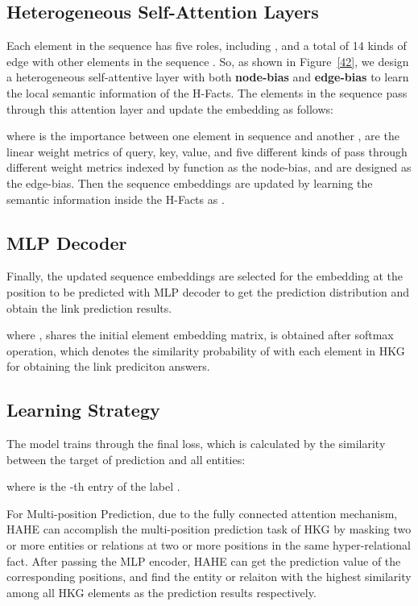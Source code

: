 \documentclass[11pt]{article}
\begin{document}
\subsection{Heterogeneous Self-Attention Layers}
 Each element in the sequence  has five roles, including , and a total of 14 kinds of edge with other elements in the sequence  . So, as shown in Figure~\ref{42}, we design a heterogeneous self-attentive layer with both \textbf{node-bias} and \textbf{edge-bias} to learn the local semantic information of the H-Facts. The elements in the sequence pass through this attention layer and update the embedding as follows:


where  is the importance between one element in sequence  and another ,  are the linear weight metrics of query, key, value, and five different kinds of  pass through different weight metrics indexed by  function as the node-bias, and  are designed as the edge-bias. Then the sequence embeddings are updated by learning the semantic information inside the H-Facts as .



\subsection{MLP Decoder}
Finally, the updated sequence embeddings are selected for the embedding at the position to be predicted  with MLP decoder to get the prediction distribution and obtain the link prediction results.

where ,  shares the initial element embedding matrix,  is obtained after softmax operation, which denotes the similarity probability of  with each element in HKG for obtaining the link prediciton answers.

\subsection{Learning Strategy}
\label{LS}

The model trains through the final loss, which is calculated by the similarity between the target of prediction and all entities:

where  is the -th entry of the label . 

For Multi-position Prediction, due to the fully connected attention mechanism, HAHE can accomplish the multi-position prediction task of HKG by masking two or more entities or relations at two or more positions in the same hyper-relational fact. After passing the MLP encoder, HAHE can get the prediction value  of the corresponding positions, and find the entity or relaiton with the highest similarity among all HKG elements as the prediction results respectively.
\end{document}
